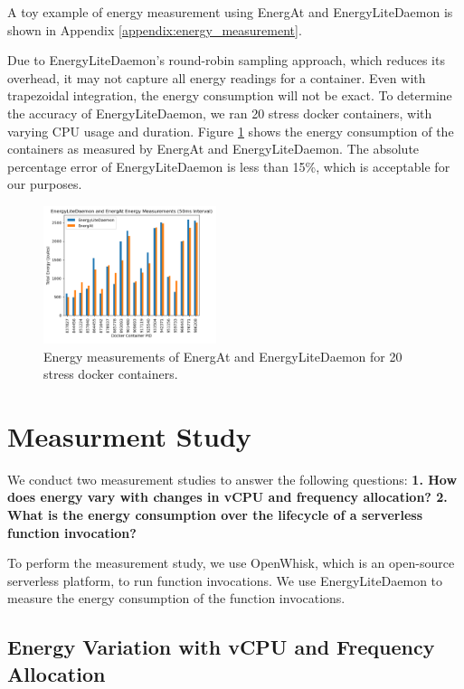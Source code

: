 \documentclass[times, 10pt,twocolumn]{article}
\begin{document}
A toy example of energy measurement using EnergAt and EnergyLiteDaemon is shown in Appendix \ref{appendix:energy_measurement}.

Due to EnergyLiteDaemon's round-robin sampling approach, which reduces its overhead, it may not capture all energy readings for a container. Even with trapezoidal integration, the energy consumption will not be exact. To determine the accuracy of EnergyLiteDaemon, we ran 20 stress docker containers, with varying CPU usage and duration. Figure \ref{fig:EnergyLiteDaemon_Efficacy} shows the energy consumption of the containers as measured by EnergAt and EnergyLiteDaemon. The absolute percentage error of EnergyLiteDaemon is less than 15\%, which is acceptable for our purposes.

\begin{figure}[ht]
   \centering
   \includegraphics[width=0.45\textwidth]{imgs/EnergyLiteDaemon_Efficacy.png}
   \caption{Energy measurements of EnergAt and EnergyLiteDaemon for 20 stress docker containers.}
   \label{fig:EnergyLiteDaemon_Efficacy}
 \end{figure}

\section{Measurment Study}

We conduct two measurement studies to answer the following questions: \textbf{1. How does energy vary with changes in vCPU and frequency allocation? 2. What is the energy consumption over the lifecycle of a serverless function invocation?}

To perform the measurement study, we use OpenWhisk, which is an open-source serverless platform, to run function invocations. We use EnergyLiteDaemon to measure the energy consumption of the function invocations.

\subsection{Energy Variation with vCPU and Frequency Allocation}
\end{document}
